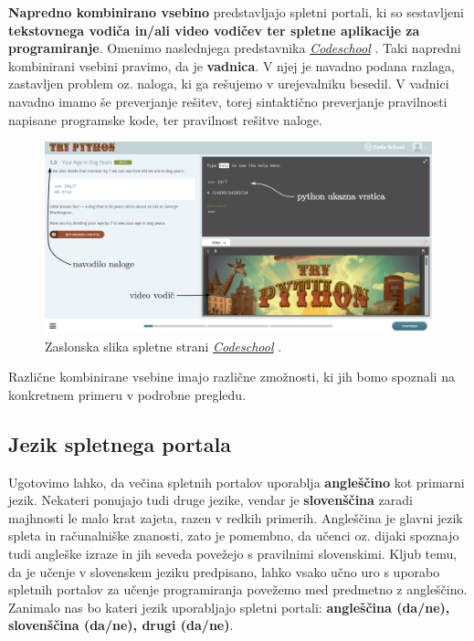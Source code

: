 \textbf{Napredno kombinirano vsebino} predstavljajo spletni portali,
ki so sestavljeni \textbf{tekstovnega vodiča in/ali video vodičev ter
  spletne aplikacije za programiranje}. Omenimo naslednjega
predstavnika \emph{\href{https://www.codeschool.com/}{Codeschool}}
\cite{web:codeschool}. Taki napredni kombinirani vsebini pravimo, da
je \textbf{vadnica}. V njej je navadno podana razlaga, zastavljen
problem oz. naloga, ki ga rešujemo v urejevalniku besedil. V vadnici
navadno imamo še  preverjanje rešitev, torej sintaktično preverjanje
pravilnosti napisane programske kode, ter pravilnost rešitve naloge.

\begin{figure}[h!]
    \includegraphics [width=1\linewidth, keepaspectratio =
    1] {./images/sc_web/codeschool_01.jpg}
    \caption{Zaslonska slika spletne strani
      \emph{\href{https://www.codeschool.com/}{Codeschool}}
      \cite{web:codeschool}.}
    \label{fig:scr:web:codeschool}
\end{figure}

Različne kombinirane vsebine imajo različne zmožnosti, ki jih bomo
spoznali na konkretnem primeru v podrobne pregledu.

\subsection{Jezik spletnega portala}
\label{sec:jezik_spletnega_portala}

Ugotovimo lahko, da večina spletnih portalov uporablja
\textbf{angleščino} kot primarni jezik. Nekateri ponujajo tudi druge
jezike, vendar je \textbf{slovenščina} zaradi majhnosti le malo krat
zajeta, razen v redkih primerih. Angleščina je glavni jezik spleta in
računalniške znanosti, zato je pomembno, da učenci oz. dijaki spoznajo
tudi angleške izraze in jih seveda povežejo s pravilnimi
slovenskimi. Kljub temu, da je učenje v slovenskem jeziku predpisano,
lahko vsako učno uro s uporabo spletnih portalov za učenje
programiranja povežemo med predmetno z angleščino. Zanimalo nas bo
kateri jezik uporabljajo spletni portali: \textbf{angleščina (da/ne),
  slovenščina (da/ne), drugi (da/ne)}.


